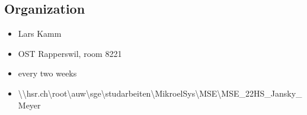 \subsection{Organization}
\begin{itemize}
	\item {Lars Kamm}
	\item {OST Rapperswil, room 8221}
	\item {every two weeks}
	\item { \textbackslash \textbackslash hsr.ch\textbackslash root\textbackslash auw\textbackslash sge\textbackslash studarbeiten\textbackslash MikroelSys\textbackslash MSE\textbackslash MSE\_22HS\_Jansky\_Meyer}
\end{itemize}
\cleardoublepage